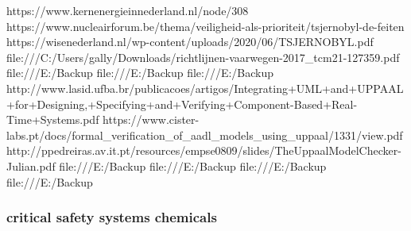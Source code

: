 https://www.kernenergieinnederland.nl/node/308
https://www.nucleairforum.be/thema/veiligheid-als-prioriteit/tsjernobyl-de-feiten
https://wisenederland.nl/wp-content/uploads/2020/06/TSJERNOBYL.pdf
file:///C:/Users/gally/Downloads/richtlijnen-vaarwegen-2017_tcm21-127359.pdf
file:///E:/Backup%
file:///E:/Backup%
file:///E:/Backup%
http://www.lasid.ufba.br/publicacoes/artigos/Integrating+UML+and+UPPAAL+for+Designing,+Specifying+and+Verifying+Component-Based+Real-Time+Systems.pdf
https://www.cister-labs.pt/docs/formal_verification_of_aadl_models_using_uppaal/1331/view.pdf
http://ppedreiras.av.it.pt/resources/empse0809/slides/TheUppaalModelChecker-Julian.pdf
file:///E:/Backup%
file:///E:/Backup%
file:///E:/Backup%
file:///E:/Backup%
\subsubsection{critical safety systems chemicals}

